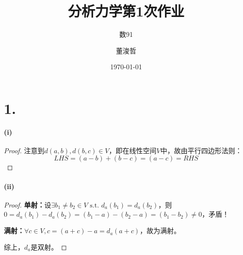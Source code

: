 \documentclass{ctexart}
\title{分析力学第1次作业}
\author{数91\and 董浚哲}
\date{\today}
\newcommand{\st}{\text{ s.t. }}
\begin{document}
\maketitle

\section*{1.}
\paragraph{(i)}
\begin{proof}
  注意到$d(a,b),d(b,c)\in V$，即在线性空间$V$中，故由平行四边形法则：
  \[LHS=(a-b)+(b-c)=(a-c)=RHS\]
\end{proof}

\paragraph{(ii)}
\begin{proof}
  \textbf{单射：}设$\exists b_{1}\neq b_{2}\in V\st d_{a}(b_{1})=d_{a}(b_{2})$，则$0=d_{a}(b_{1})-d_{a}(b_{2})=(b_{1}-a)-(b_{2}-a)=(b_{1}-b_{2})\neq 0$，矛盾！

  \textbf{满射：}$\forall c\in V, c=(a+c)-a=d_{a}(a+c)$，故为满射。

  综上，$d_{a}$是双射。
\end{proof}
\end{document}
